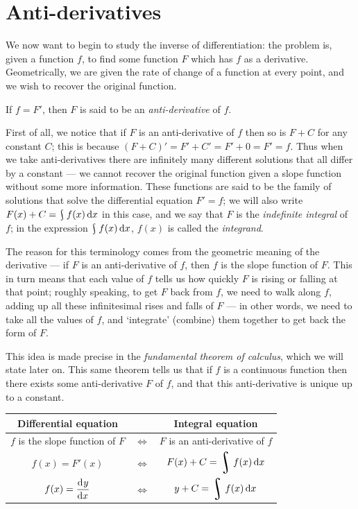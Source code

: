 \section{Anti-derivatives}
We now want to begin to study the inverse of differentiation: the problem is, given
a function $ f $, to find some function $ F $ which has $ f $ as a derivative. Geometrically,
we are given the rate of change of a function at every point, and we wish to recover the
original function.

If $ f = F' $, then $ F $ is said to be an \emph{anti-derivative} of $ f $.

First of all, we notice that if $ F $ is an anti-derivative of $ f $ then so is $ F + C $
for any constant $ C $; this is because $ (F + C)' = F' + C' = F' + 0 = F' = f $. Thus
when we take anti-derivatives there are infinitely many different solutions that all differ
by a constant --- we cannot recover the original function given a slope function without
some more information. These functions are said to be the family of solutions that solve the
differential equation $ F' = f $; we will also write $ F(x) + C = \rint f(x) \dif{x} $ in
this case, and we say that $ F $ is the \emph{indefinite integral} of $ f $; in the
expression $ \rint f(x) \dif{x} $, $ f(x) $ is called the \emph{integrand}.

The reason for this terminology comes from the geometric meaning of the derivative --- if
$ F $ is an anti-derivative of $ f $, then $ f $ is the slope function of $ F $. This in
turn means that each value of $ f $ tells us how quickly $ F $ is rising or falling at that
point; roughly speaking, to get $ F $ back from $ f $, we need to walk along $ f $, adding
up all these infinitesimal rises and falls of $ F $ --- in other words, we need to take
all the values of $ f $, and `integrate' (combine) them together to get back the form of $ F $.

This idea is made precise in the \emph{fundamental theorem of calculus}, which we will state later on. This
same theorem tells us that if $ f $ is a continuous function then there exists some anti-derivative $ F $
of $ f $, and that this anti-derivative is unique up to a constant.

\begin{center}
  \def\arraystretch{2}
  \begin{tabular}{|c|c|c|}\hline
    \textbf{Differential equation} && \textbf{Integral equation}\\\hline
    $ f $ is the slope function of $ F $ & $\displaystyle\iff$ & $ F $ is an anti-derivative of $ f $ \\\hline
    $\displaystyle f(x) = F'(x) $ &$\displaystyle\iff$& $\displaystyle F(x) + C = \rint f(x) \dif{x} $\\\hline
    $\displaystyle f(x) = \dod{y}{x} $ &$\displaystyle\iff$& $\displaystyle y + C = \rint f(x) \dif{x} $\\\hline
  \end{tabular}
\end{center}

